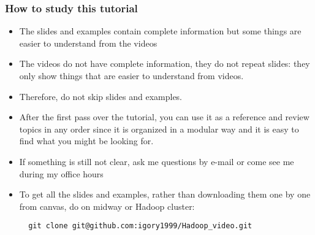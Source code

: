 \documentclass{beamer}
\begin{document}
\begin{frame}[fragile]
  \frametitle{How to study this tutorial}
  \begin{itemize}
  \item The slides and examples contain complete information but some things are easier to understand from the videos
  \item The videos do not have complete information, they do not repeat slides:
    they only show things that are easier to understand from videos.
  \item Therefore, do not skip slides and examples.
  \item After the first pass over the tutorial, you can use it as a reference and review topics in any order
    since it is organized in a modular way and it is easy to find what you might be looking for.    
  \item If something is still not clear, ask me questions by e-mail or come see me during my office hours
  \item To get all the slides and examples, rather than downloading them one by one from canvas, do on midway or Hadoop cluster:
    {\color{mycolorcli}
\begin{verbatim}
  git clone git@github.com:igory1999/Hadoop_video.git
\end{verbatim}
    }
  \end{itemize}
\end{frame}
\end{document}
